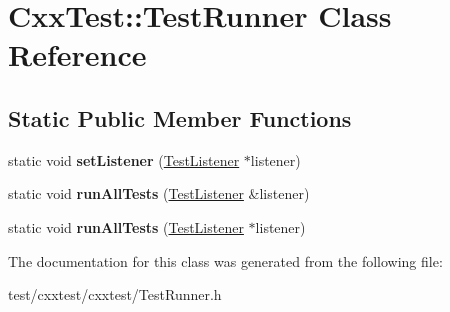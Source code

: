 \hypertarget{classCxxTest_1_1TestRunner}{\section{Cxx\-Test\-:\-:Test\-Runner Class Reference}
\label{classCxxTest_1_1TestRunner}
}
\subsection*{Static Public Member Functions}
\begin{DoxyCompactItemize}
\item 
\hypertarget{classCxxTest_1_1TestRunner_a9b3e3de1ce1fa97389131aca21cd7c7b}{static void {\bfseries set\-Listener} (\hyperlink{classCxxTest_1_1TestListener}{Test\-Listener} $\ast$listener)}\label{classCxxTest_1_1TestRunner_a9b3e3de1ce1fa97389131aca21cd7c7b}

\item 
\hypertarget{classCxxTest_1_1TestRunner_a8aeaf09a5d5553c9d7c05733fdacdbf0}{static void {\bfseries run\-All\-Tests} (\hyperlink{classCxxTest_1_1TestListener}{Test\-Listener} \&listener)}\label{classCxxTest_1_1TestRunner_a8aeaf09a5d5553c9d7c05733fdacdbf0}

\item 
\hypertarget{classCxxTest_1_1TestRunner_a4e505f5ce94f49d640b27b994f06d8d8}{static void {\bfseries run\-All\-Tests} (\hyperlink{classCxxTest_1_1TestListener}{Test\-Listener} $\ast$listener)}\label{classCxxTest_1_1TestRunner_a4e505f5ce94f49d640b27b994f06d8d8}

\end{DoxyCompactItemize}


The documentation for this class was generated from the following file\-:\begin{DoxyCompactItemize}
\item 
test/cxxtest/cxxtest/Test\-Runner.\-h\end{DoxyCompactItemize}
